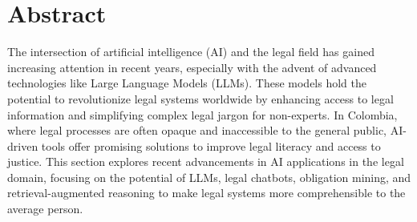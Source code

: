 
\chapter{Abstract}
The intersection of artificial intelligence (AI) and the legal field has gained 
increasing attention in recent years, especially with the advent of advanced 
technologies like Large Language Models (LLMs).
These models hold the potential to revolutionize legal systems worldwide by 
enhancing access to legal information and simplifying complex legal jargon for non-experts.
In Colombia, where legal processes are often opaque and inaccessible to the general public, 
AI-driven tools offer promising solutions to improve legal literacy and access to justice. 
This section explores recent advancements in AI applications in the legal domain, 
focusing on the potential of LLMs, legal chatbots, obligation mining, and retrieval-augmented 
reasoning to make legal systems more comprehensible to the average person.
\endinput

